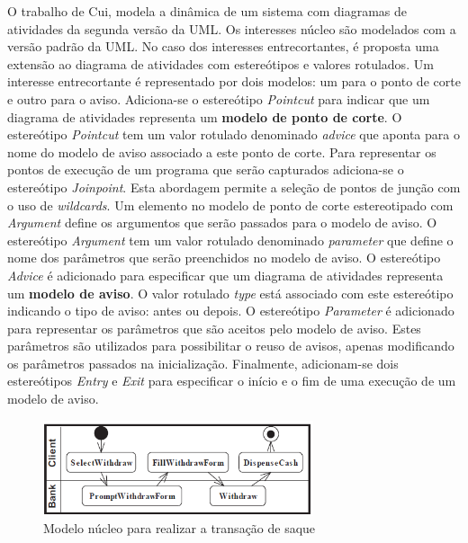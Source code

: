 O trabalho de Cui, \cite{Cui:2009:MIA:1529282.1529377} modela a dinâmica de um sistema com diagramas de atividades da segunda versão da UML. Os
interesses núcleo são modelados com a versão padrão da UML. No caso dos interesses entrecortantes, é proposta uma extensão ao diagrama de atividades com
estereótipos e valores rotulados. Um interesse entrecortante é representado por dois modelos: um para o ponto de corte e outro para o aviso.
Adiciona-se o estereótipo \textit{Pointcut} para indicar que um diagrama de atividades representa um \textbf{modelo de ponto de corte}. O estereótipo
\textit{Pointcut} tem um valor rotulado denominado \textit{advice} que aponta para o nome do modelo de aviso associado a este ponto de corte. Para
representar os pontos de execução de um programa que serão capturados adiciona-se o estereótipo \textit{Joinpoint}. Esta abordagem permite a seleção
de pontos de junção com o uso de \textit{wildcards}. Um elemento no modelo de ponto de corte estereotipado com \textit{Argument} define os argumentos
que serão passados para o modelo de aviso. O estereótipo \textit{Argument} tem um valor rotulado denominado \textit{parameter} que define o nome dos
parâmetros que serão preenchidos no modelo de aviso. O estereótipo \textit{Advice} é adicionado para especificar que um diagrama de atividades
representa um \textbf{modelo de aviso}. O valor rotulado \textit{type} está associado com este estereótipo indicando o tipo de aviso: antes ou depois.
O estereótipo \textit{Parameter} é adicionado para representar os parâmetros que são aceitos pelo modelo de aviso. Estes parâmetros são utilizados
para possibilitar o reuso de avisos, apenas modificando os parâmetros passados na inicialização. Finalmente, adicionam-se dois estereótipos
\textit{Entry} e \textit{Exit} para especificar o início e o fim de uma execução de um modelo de aviso.
 
\begin{figure}
	\centering
	\includegraphics[width=300px]{img/withdraw_base.png}
	\caption{Modelo núcleo para realizar a transação de saque}\label{fig:withdraw_base}
\end{figure}

